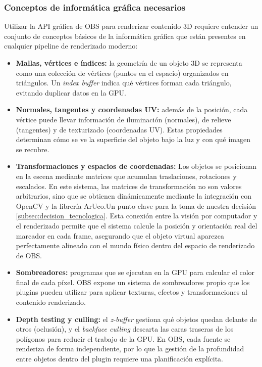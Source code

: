 \subsubsection*{Conceptos de informática gráfica necesarios}

Utilizar la API gráfica de OBS para renderizar contenido 3D requiere entender un conjunto de conceptos básicos de la informática gráfica que están presentes en cualquier pipeline de renderizado moderno:

\begin{itemize}
    \item \textbf{Mallas, vértices e índices:} la geometría de un objeto 3D se representa como una colección de vértices (puntos en el espacio) organizados en triángulos. Un \emph{index buffer} indica qué vértices forman cada triángulo, evitando duplicar datos en la GPU.
    \item \textbf{Normales, tangentes y coordenadas UV:} además de la posición, cada vértice puede llevar información de iluminación (normales), de relieve (tangentes) y de texturizado (coordenadas UV). Estas propiedades determinan cómo se ve la superficie del objeto bajo la luz y con qué imagen se recubre.
    \item \textbf{Transformaciones y espacios de coordenadas:} Los objetos se posicionan en la escena mediante matrices que acumulan traslaciones, rotaciones y escalados. En este sistema, las matrices de transformación no son valores arbitrarios, sino que se obtienen dinámicamente mediante la integración con OpenCV y la librería ArUco.Un punto clave para la toma de nuestra decisión \ref{subsec:decision_tecnologica}. Esta conexión entre la visión por computador y el renderizado permite que el sistema calcule la posición y orientación real del marcador en cada frame, asegurando que el objeto virtual aparezca perfectamente alineado con el mundo físico dentro del espacio de renderizado de OBS.
    \item \textbf{Sombreadores:} programas que se ejecutan en la GPU para calcular el color final de cada píxel. OBS expone un sistema de sombreadores propio que los plugins pueden utilizar para aplicar texturas, efectos y transformaciones al contenido renderizado.
    \item \textbf{Depth testing y culling:} el \emph{z-buffer} gestiona qué objetos quedan delante de otros (oclusión), y el \emph{backface culling} descarta las caras traseras de los polígonos para reducir el trabajo de la GPU. En OBS, cada fuente se renderiza de forma independiente, por lo que la gestión de la profundidad entre objetos dentro del plugin requiere una planificación explícita.
\end{itemize}

